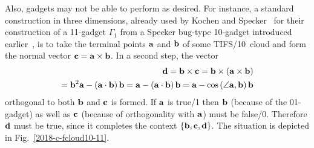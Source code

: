 \documentclass[%
  reprint,
  twocolumn,
 showpacs,
 showkeys,
 preprintnumbers,
 amsmath,amssymb,
 aps,
  prl,
  longbibliography,
 ]{revtex4-1}
\begin{document}
Also, gadgets may not be able to perform as desired.
For instance, a standard construction in three dimensions, already used by Kochen and Specker~\cite[Lemma~1, $\Gamma_1$, p.~68]{kochen1} for their construction of a
11-gadget $\Gamma_1$ from a Specker bug-type 10-gadget introduced earlier~\cite[Fig.~1, p.~182]{kochen2},
is to take the terminal points  ${\bf a}$ and ${\bf b}$ of some TIFS/10~cloud
and form the normal vector  ${\bf c} = {\bf a} \times {\bf b}$.
In a second step, the vector
\begin{equation}
\begin{split}
{\bf d} = {\bf b} \times {\bf c}
={\bf b} \times \left({\bf a} \times {\bf b}\right)      \\
  = {\bf b}^2  {\bf a} - \left({\bf a}\cdot {\bf b}\right)  {\bf b}
=  {\bf a} - \left({\bf a}\cdot {\bf b}\right)  {\bf b}
  =  {\bf a} - \cos \left( \angle {\bf a}, {\bf b}\right)  {\bf b}
\end{split}
\end{equation}
orthogonal to both ${\bf b}$ and ${\bf c}$ is formed.
If  ${\bf a}$ is true/1 then ${\bf b}$ (because of the 01-gadget) as well as ${\bf c}$ (because of orthogonality with ${\bf a}$) must be false/0.
Therefore ${\bf d}$ must be true, since it completes the context $\left\{ {\bf b},{\bf c},{\bf d}\right\}$.
The situation is depicted in Fig.~\ref{2018-c-fcloud10-11}.
\end{document}
